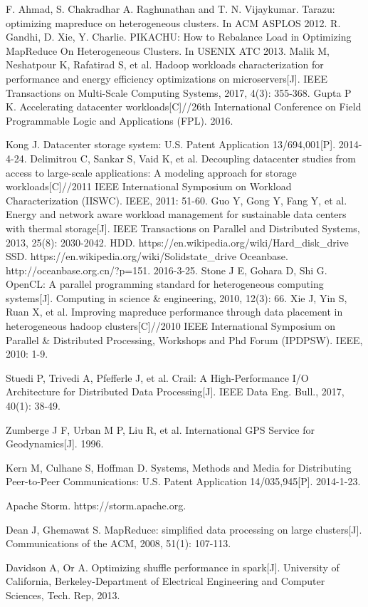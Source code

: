 \documentclass[conference]{IEEEtran}
\begin{document}
\begin{thebibliography}{00}
 F. Ahmad, S. Chakradhar A. Raghunathan and T. N. Vijaykumar. Tarazu: optimizing mapreduce on heterogeneous clusters. In ACM ASPLOS 2012.
 R. Gandhi, D. Xie, Y. Charlie. PIKACHU: How to Rebalance Load in Optimizing MapReduce On Heterogeneous Clusters. In USENIX ATC 2013.
Malik M, Neshatpour K, Rafatirad S, et al. Hadoop workloads characterization for performance and energy efficiency optimizations on microservers[J]. IEEE Transactions on Multi-Scale Computing Systems, 2017, 4(3): 355-368.
Gupta P K. Accelerating datacenter workloads[C]//26th International Conference on Field Programmable Logic and Applications (FPL). 2016.

Kong J. Datacenter storage system: U.S. Patent Application 13/694,001[P]. 2014-4-24.
Delimitrou C, Sankar S, Vaid K, et al. Decoupling datacenter studies from access to large-scale applications: A modeling approach for storage workloads[C]//2011 IEEE International Symposium on Workload Characterization (IISWC). IEEE, 2011: 51-60.
Guo Y, Gong Y, Fang Y, et al. Energy and network aware workload management for sustainable data centers with thermal storage[J]. IEEE Transactions on Parallel and Distributed Systems, 2013, 25(8): 2030-2042.
 HDD. https://en.wikipedia.org/wiki/Hard\_disk\_drive
 SSD. https://en.wikipedia.org/wiki/Solid\-state\_drive
 Oceanbase. http://oceanbase.org.cn/?p=151. 2016-3-25.
Stone J E, Gohara D, Shi G. OpenCL: A parallel programming standard for heterogeneous computing systems[J]. Computing in science \& engineering, 2010, 12(3): 66.
Xie J, Yin S, Ruan X, et al. Improving mapreduce performance through data placement in heterogeneous hadoop clusters[C]//2010 IEEE International Symposium on Parallel \& Distributed Processing, Workshops and Phd Forum (IPDPSW). IEEE, 2010: 1-9.

Stuedi P, Trivedi A, Pfefferle J, et al. Crail: A High-Performance I/O Architecture for Distributed Data Processing[J]. IEEE Data Eng. Bull., 2017, 40(1): 38-49.

Zumberge J F, Urban M P, Liu R, et al. International GPS Service for Geodynamics[J]. 1996.

Kern M, Culhane S, Hoffman D. Systems, Methods and Media for Distributing Peer-to-Peer Communications: U.S. Patent Application 14/035,945[P]. 2014-1-23.


Apache Storm. https://storm.apache.org.

Dean J, Ghemawat S. MapReduce: simplified data processing on large clusters[J]. Communications of the ACM, 2008, 51(1): 107-113.

Davidson A, Or A. Optimizing shuffle performance in spark[J]. University of California, Berkeley-Department of Electrical Engineering and Computer Sciences, Tech. Rep, 2013.
\end{thebibliography}
\end{document}
